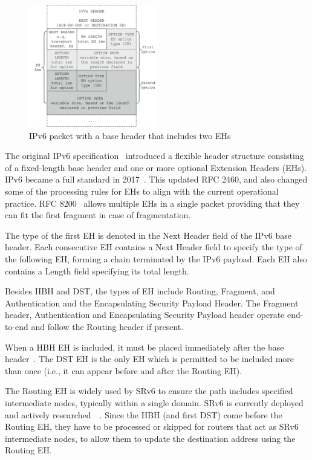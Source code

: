 \documentclass[conference]{IEEEtran}
\begin{document}
\begin{figure}
\centering
  \includegraphics[width=0.5\textwidth]{ehformat.png}
  \caption{IPv6 packet with a base header that includes two EHs}
  \label{fig:eh-format}
\end{figure}


The original IPv6 specification~\cite{rfc2460} introduced a flexible header structure consisting of a fixed-length base header and one or more optional Extension Headers (EHs). 
IPv6 became a full standard in 2017~\cite{RFC8200}. This updated RFC 2460, and also changed some of the processing rules for EHs to align with the current operational practice. RFC 8200~\cite{RFC8200} allows multiple EHs in a single packet providing that they can fit the first fragment in case of fragmentation. 

The type of the first EH is denoted in the Next Header field of the IPv6 base header. Each consecutive EH contains a Next Header field to specify the type of the following EH, forming a chain terminated by the IPv6 payload. Each EH also contains a Length field specifying its total length. 

Besides HBH and DST, the types of EH include Routing, Fragment, and
Authentication and the Encapsulating Security Payload Header.
The Fragment header, Authentication and Encapsulating Security Payload header operate end-to-end and follow the Routing header if present. 

When a HBH EH is included, it must be placed immediately after the base header~\cite{RFC8200}.  The DST EH is the only EH which is permitted to be included more than once (i.e., it can appear before and after the Routing EH). 

The Routing EH is widely used by SRv6 to ensure the path includes specified intermediate nodes, typically within a single domain. SRv6 is currently deployed and actively researched~\cite{srv6}~\cite{srperf}.
Since the HBH (and first DST) come before the Routing EH, they have to be processed or skipped for routers that act as SRv6 intermediate nodes, to allow them to update the destination address using the Routing EH.
\end{document}
